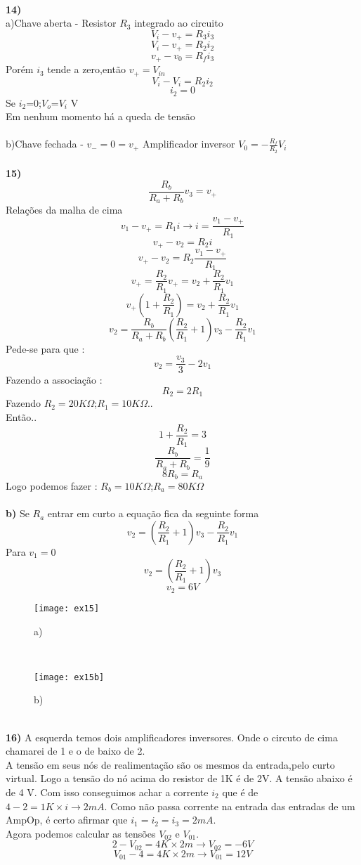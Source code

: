 \documentclass[11pt,a4paper]{article}
\begin{document}
\\
\textbf{14) }
\\
a)Chave aberta - Resistor $R_3$ integrado ao circuito\\
$$V_i-v_+=R_3i_3$$
$$V_i-v_+=R_2i_2$$
$$v_+-v_0=R_fi_3$$
Porém $i_3$ tende a zero,então $v_+=V_{in}$
$$V_i-V_i=R_2i_2$$
$$i_2=0$$
Se $i_2$=0;$V_o$=$V_i$ V\\
Em nenhum momento há a queda de tensão\\\\
b)Chave fechada - $v_-=0=v_+$
Amplificador inversor $V_0=-\frac{R_f}{R_2}V_i$
\\\\
\textbf{15) }
$$\frac{R_b}{R_a+R_b}v_3=v_+$$
Relações da malha de cima\\
$$v_1-v_+=R_1i\rightarrow i=\frac{v_1-v_+}{R_1}$$
$$v_+-v_2=R_2i$$
$$v_+-v_2=R_2\frac{v_1-v_+}{R_1}$$
$$v_+=\frac{R_2}{R_1}v_+=v_2+\frac{R_2}{R_1}v_1$$
$$v_+\left( 1+\frac{R_2}{R_1}  \right)=v_2+\frac{R_2}{R_1}v_1$$
$$v_2=\frac{R_b}{R_a+R_b}\left(\frac{R_2}{R_1}+1\right)v_3 -\frac{R_2}{R_1}v_1$$
Pede-se para que :
$$v_2=\frac{v_3}{3}-2v_1$$
Fazendo a associação :
$$R_2=2R_1$$
Fazendo $R_2=20K\Omega$;$R_1=10K\Omega$..\\
Então.. 
$$1+\frac{R_2}{R_1}=3$$
$$\frac{R_b}{R_a+R_b}=\frac{1}{9}$$
$$8R_b=R_a$$
Logo podemos fazer : $R_b=10K\Omega$;$R_a=80K\Omega$
\\\\
\textbf{b) }
Se $R_a$ entrar em curto a equação fica da seguinte forma
$$v_2=\left(\frac{R_2}{R_1}+1\right)v_3 -\frac{R_2}{R_1}v_1$$
Para $v_1=0$\\
$$v_2=\left(\frac{R_2}{R_1}+1\right)v_3 $$
$$v_2=6V$$
\begin{figure}[!h]
\begin{center}
\texttt{[image: ex15]}
\caption{a)}
\end{center}
\end{figure}
\\
\begin{figure}[!h]
\begin{center}
\texttt{[image: ex15b]}
\caption{b)}
\end{center}
\end{figure}
\\
\newpage
\textbf{16) }
A esquerda temos dois amplificadores inversores. Onde o circuto de cima chamarei de 1 e o de baixo de 2.\\
A tensão em seus nós de realimentação são os mesmos da entrada,pelo curto virtual. Logo a tensão do nó acima do resistor de 1K é de 2V. A tensão abaixo é de 4 V. Com isso conseguimos achar a corrente $i_2$ que é de $4-2=1K\times i \rightarrow 2mA$. Como não passa corrente na entrada das entradas de um AmpOp, é certo afirmar que $i_1=i_2=i_3=2mA$.\\
Agora podemos calcular as tensões $V_{02}$ e $V_{01}$.
$$2-V_{02}=4K\times 2m \rightarrow V_{02}=-6 V$$  
$$ V_{01}-4=4K\times 2m \rightarrow V_{01}=12 V$$
\end{document}
